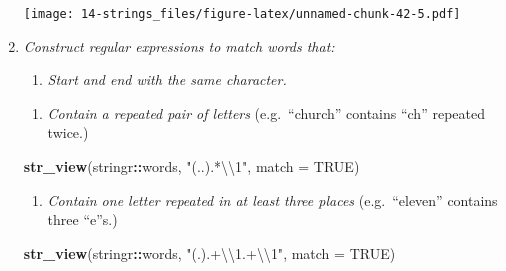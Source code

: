 \documentclass[]{book}
\newenvironment{Shaded}{\begin{snugshade}}{\end{snugshade}}
\newcommand{\CharTok}[1]{\textcolor[rgb]{0.31,0.60,0.02}{#1}}
\newcommand{\DataTypeTok}[1]{\textcolor[rgb]{0.13,0.29,0.53}{#1}}
\newcommand{\KeywordTok}[1]{\textcolor[rgb]{0.13,0.29,0.53}{\textbf{#1}}}
\newcommand{\NormalTok}[1]{#1}
\newcommand{\OperatorTok}[1]{\textcolor[rgb]{0.81,0.36,0.00}{\textbf{#1}}}
\newcommand{\OtherTok}[1]{\textcolor[rgb]{0.56,0.35,0.01}{#1}}
\newcommand{\StringTok}[1]{\textcolor[rgb]{0.31,0.60,0.02}{#1}}
\providecommand{\tightlist}{%
  \setlength{\itemsep}{0pt}\setlength{\parskip}{0pt}}
\theoremstyle{definition}
\theoremstyle{definition}
\theoremstyle{definition}
\theoremstyle{remark}
\begin{document}
\begin{enumerate}
  \texttt{[image: 14-strings\_files/figure-latex/unnamed-chunk-42-5.pdf]}
\item
  \emph{Construct regular expressions to match words that:}

  \begin{enumerate}
  \def\labelenumii{\arabic{enumii}.}
  \tightlist
  \item
    \emph{Start and end with the same character.}
  \end{enumerate}

\begin{Shaded}
\end{Shaded}

  \begin{enumerate}
  \def\labelenumii{\arabic{enumii}.}
  \setcounter{enumii}{1}
  \tightlist
  \item
    \emph{Contain a repeated pair of letters} (e.g.~``church'' contains
    ``ch'' repeated twice.)
  \end{enumerate}

\begin{Shaded}
\begin{Highlighting}[]
\KeywordTok{str_view}\NormalTok{(stringr}\OperatorTok{::}\NormalTok{words, }\StringTok{"(..).*}\CharTok{\textbackslash{}\textbackslash{}}\StringTok{1"}\NormalTok{, }\DataTypeTok{match =} \OtherTok{TRUE}\NormalTok{)}
\end{Highlighting}
\end{Shaded}

  \begin{enumerate}
  \def\labelenumii{\arabic{enumii}.}
  \setcounter{enumii}{2}
  \tightlist
  \item
    \emph{Contain one letter repeated in at least three places}
    (e.g.~``eleven'' contains three ``e''s.)
  \end{enumerate}

\begin{Shaded}
\begin{Highlighting}[]
\KeywordTok{str_view}\NormalTok{(stringr}\OperatorTok{::}\NormalTok{words, }\StringTok{"(.).+}\CharTok{\textbackslash{}\textbackslash{}}\StringTok{1.+}\CharTok{\textbackslash{}\textbackslash{}}\StringTok{1"}\NormalTok{, }\DataTypeTok{match =} \OtherTok{TRUE}\NormalTok{)}
\end{Highlighting}
\end{Shaded}
\end{enumerate}
\end{document}
